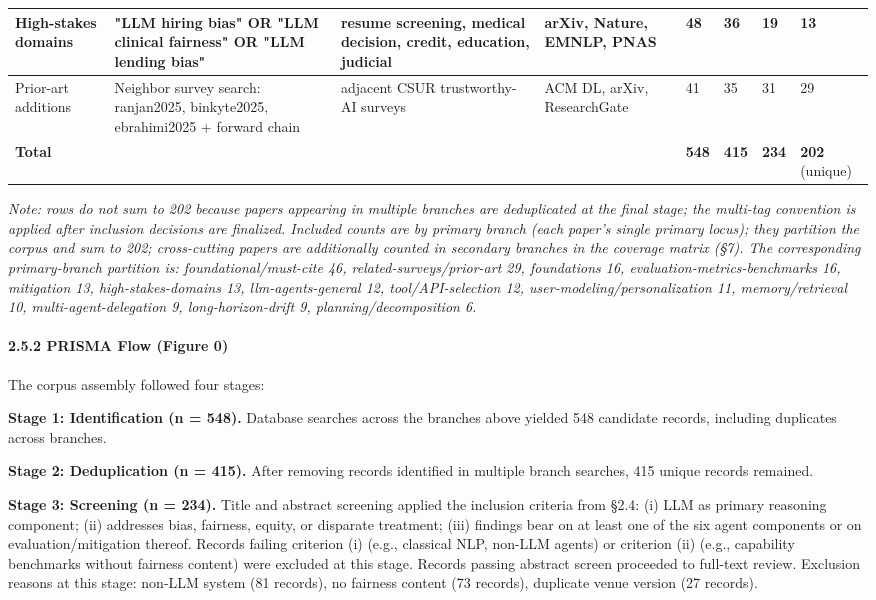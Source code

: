 \documentclass[10pt]{article}
\begin{document}
\begin{center}
\begin{longtable}{|p{}|p{}|p{}|p{}|p{}|p{}|p{}|p{}|}
High-stakes domains & "LLM hiring bias" OR "LLM clinical fairness" OR "LLM lending bias" & resume screening, medical decision, credit, education, judicial & arXiv, Nature, EMNLP, PNAS & 48 & 36 & 19 & 13 \\ \hline
Prior-art additions & Neighbor survey search: ranjan2025, binkyte2025, ebrahimi2025 + forward chain & adjacent CSUR trustworthy-AI surveys & ACM DL, arXiv, ResearchGate & 41 & 35 & 31 & 29 \\ \hline
\textbf{Total} &  &  &  & \textbf{548} & \textbf{415} & \textbf{234} & \textbf{202} (unique) \\ \hline
\end{longtable}\end{center}

\emph{Note: rows do not sum to 202 because papers appearing in multiple branches are deduplicated at the final stage; the multi-tag convention is applied after inclusion decisions are finalized. Included counts are by primary branch (each paper's single primary locus); they partition the corpus and sum to 202; cross-cutting papers are additionally counted in secondary branches in the coverage matrix (\S{}7). The corresponding primary-branch partition is: foundational/must-cite 46, related-surveys/prior-art 29, foundations 16, evaluation-metrics-benchmarks 16, mitigation 13, high-stakes-domains 13, llm-agents-general 12, tool/API-selection 12, user-modeling/personalization 11, memory/retrieval 10, multi-agent-delegation 9, long-horizon-drift 9, planning/decomposition 6.}

\paragraph*{2.5.2 PRISMA Flow (Figure 0)}

The corpus assembly followed four stages:

\textbf{Stage 1: Identification (n = 548).} Database searches across the branches above yielded 548 candidate records, including duplicates across branches.

\textbf{Stage 2: Deduplication (n = 415).} After removing records identified in multiple branch searches, 415 unique records remained.

\textbf{Stage 3: Screening (n = 234).} Title and abstract screening applied the inclusion criteria from \S{}2.4: (i) LLM as primary reasoning component; (ii) addresses bias, fairness, equity, or disparate treatment; (iii) findings bear on at least one of the six agent components or on evaluation/mitigation thereof. Records failing criterion (i) (e.g., classical NLP, non-LLM agents) or criterion (ii) (e.g., capability benchmarks without fairness content) were excluded at this stage. Records passing abstract screen proceeded to full-text review. Exclusion reasons at this stage: non-LLM system (81 records), no fairness content (73 records), duplicate venue version (27 records).
\end{document}
